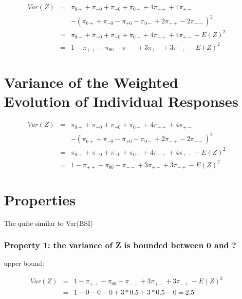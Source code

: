 \documentclass[12pt,a4paper,oneside]{book}
\begin{document}

\begin{eqnarray}
Var(Z) &=& \pi_{0+} + \pi_{-0} + \pi_{+0} + \pi_{0-} +4\pi_{-+} +4\pi_{+-} \nonumber \nonumber \\ 
&&    - (\pi_{0+} + \pi_{-0} - \pi_{+0} - \pi_{0-} +2\pi_{-+} -2\pi_{+-})^2  \\
&=& \pi_{0+} + \pi_{-0} + \pi_{+0} + \pi_{0-} +4\pi_{-+} +4\pi_{+-} - E(Z)^2  \\
&=& 1 - \pi_{++} - \pi_{00} - \pi_{--} + 3\pi_{+-} + 3\pi_{-+} - E(Z)^2
\end{eqnarray}




\section{Variance of the Weighted Evolution of Individual Responses}


\begin{eqnarray}
Var(Z) &=& \pi_{0+} + \pi_{-0} + \pi_{+0} + \pi_{0-} +4\pi_{-+} +4\pi_{+-} \nonumber \nonumber \\ 
&&    - (\pi_{0+} + \pi_{-0} - \pi_{+0} - \pi_{0-} +2\pi_{-+} -2\pi_{+-})^2  \\
&=& \pi_{0+} + \pi_{-0} + \pi_{+0} + \pi_{0-} +4\pi_{-+} +4\pi_{+-} - E(Z)^2  \\
&=& 1 - \pi_{++} - \pi_{00} - \pi_{--} + 3\pi_{+-} + 3\pi_{-+} - E(Z)^2
\end{eqnarray}


\section{Properties}

The 
quite similar to Var(BSI)


\subsubsection{Property 1: the variance of Z is bounded between 0 and ?}
upper bound:

\begin{eqnarray}
Var(Z) &=& 1 - \pi_{++} - \pi_{00} - \pi_{--} + 3\pi_{+-} + 3\pi_{-+} - E(Z)^2 \nonumber \\
    &=& 1 - 0 - 0 - 0 + 3*0.5 + 3*0.5 - 0 = 2.5 \nonumber
\end{eqnarray}
\end{document}
